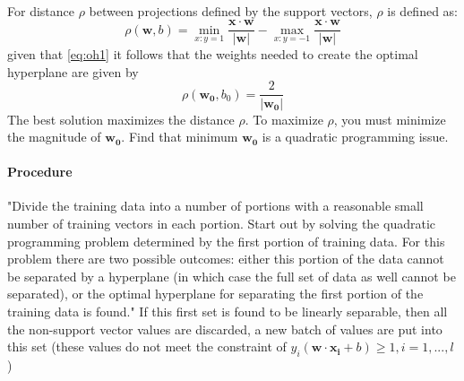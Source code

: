 			\paragraph{}
			For distance $\rho$ between projections defined by the support vectors, $\rho$ is defined as:
			\begin{equation}\rho(\mathbf{w}, b) = \min_{x:y=1} \frac{\mathbf{x} \cdot \mathbf{w}}{ |\mathbf{w}|} - \max_{x:y=-1} \frac{\mathbf{x} \cdot \mathbf{w}}{|\mathbf{w}|}\end{equation}
			given that \ref{eq:oh1} it follows that the weights needed to create the optimal hyperplane are given by
			\begin{equation} \rho (\mathbf{w_0}, b_0) = \frac{2}{|\mathbf{w_0}|}\end{equation}  The best solution maximizes the distance $\rho$.  To maximize $\rho$, you must minimize the magnitude of $\mathbf{w_0}$.  Find that minimum $\mathbf{w_0}$ is a quadratic programming issue.\cite{vapnik_support-vector_1995}

			\paragraph{Procedure} "Divide the training data into a number of portions with a reasonable small number of training vectors in each portion.  Start out by solving the quadratic programming problem determined by the first portion of training data.  For this problem there are two possible outcomes: either this portion of the data cannot be separated by a hyperplane (in which case the full set of data as well cannot be separated), or the optimal hyperplane for separating the first portion of the training data is found." If this first set is found to be linearly separable, then all the non-support vector values are discarded, a new batch of values are put into this set (these values do not meet the constraint of $y_i(\mathbf{w} \cdot \mathbf{x_i} + b) \ge 1, i = 1,...,{l}$ )
